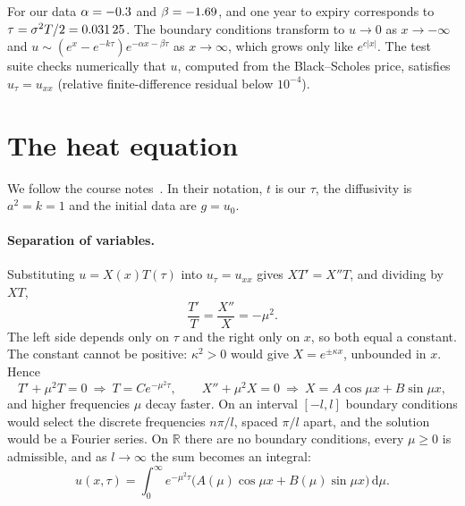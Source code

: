 \documentclass[11pt,a4paper]{article}
\theoremstyle{definition}
\theoremstyle{remark}
\newcommand{\dd}{\,\mathrm{d}}
\begin{document}
For our data $\alpha=\num{-0.3}$ and $\beta=\num{-1.69}$, and one year to expiry corresponds to
$\tau=\sigma^2T/2=\num{0.03125}$. The boundary conditions transform to $u\to0$ as $x\to-\infty$ and
$u\sim(e^x-e^{-k\tau})e^{-\alpha x-\beta\tau}$ as $x\to\infty$, which grows only like $e^{c|x|}$.
The test suite checks numerically that $u$, computed from the Black--Scholes price, satisfies
$u_\tau=u_{xx}$ (relative finite-difference residual below $10^{-4}$).

\section{The heat equation}\label{sec:heat}

We follow the course notes~\cite{classnotes}. In their notation, $t$ is our $\tau$, the diffusivity is
$a^2=k=1$ and the initial data are $g=u_0$.

\paragraph{Separation of variables.} Substituting $u=X(x)T(\tau)$ into $u_\tau=u_{xx}$ gives $XT'=X''T$, and
dividing by $XT$,
\[
  \frac{T'}{T}=\frac{X''}{X}=-\mu^2 .
\]
The left side depends only on $\tau$ and the right only on $x$, so both equal a constant. The constant cannot be
positive: $\kappa^2>0$ would give $X=e^{\pm\kappa x}$, unbounded in $x$. Hence
\[
  T'+\mu^2T=0\ \Rightarrow\ T=Ce^{-\mu^2\tau},\qquad
  X''+\mu^2X=0\ \Rightarrow\ X=A\cos\mu x+B\sin\mu x ,
\]
and higher frequencies $\mu$ decay faster. On an interval $[-l,l]$ boundary conditions would select the
discrete frequencies $n\pi/l$, spaced $\pi/l$ apart, and the solution would be a Fourier series. On $\mathbb R$
there are no boundary conditions, every $\mu\ge0$ is admissible, and as $l\to\infty$ the sum becomes an integral:
\[
  u(x,\tau)=\int_0^\infty e^{-\mu^2\tau}\big(A(\mu)\cos\mu x+B(\mu)\sin\mu x\big)\dd\mu .
\]
\end{document}
